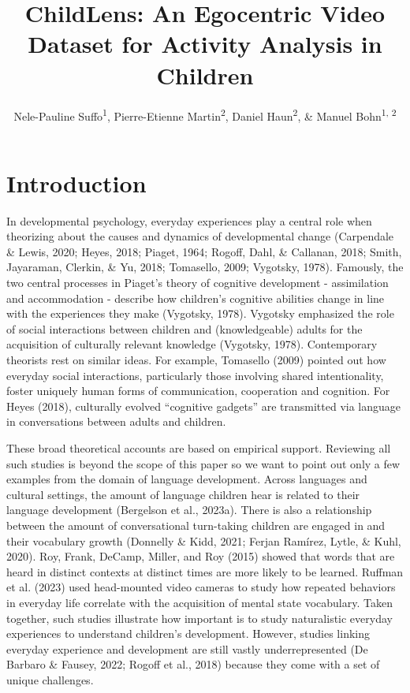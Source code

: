 \documentclass[
  man,floatsintext]{apa6}
\title{ChildLens: An Egocentric Video Dataset for Activity Analysis in Children}
\author{Nele-Pauline Suffo\textsuperscript{1}, Pierre-Etienne Martin\textsuperscript{2}, Daniel Haun\textsuperscript{2}, \& Manuel Bohn\textsuperscript{1, 2}}
\date{}
\affiliation{\vspace{0.5cm}\textsuperscript{1} Institute of Psychology in Education, Leuphana University Lüneburg\\\textsuperscript{2} Max Planck Institute for Evolutionary Anthropology}
\begin{document}
\maketitle

\section{Introduction}\label{introduction}

In developmental psychology, everyday experiences play a central role when theorizing about the causes and dynamics of developmental change (Carpendale \& Lewis, 2020; Heyes, 2018; Piaget, 1964; Rogoff, Dahl, \& Callanan, 2018; Smith, Jayaraman, Clerkin, \& Yu, 2018; Tomasello, 2009; Vygotsky, 1978). Famously, the two central processes in Piaget's theory of cognitive development - assimilation and accommodation - describe how children's cognitive abilities change in line with the experiences they make (Vygotsky, 1978). Vygotsky emphasized the role of social interactions between children and (knowledgeable) adults for the acquisition of culturally relevant knowledge (Vygotsky, 1978). Contemporary theorists rest on similar ideas. For example, Tomasello (2009) pointed out how everyday social interactions, particularly those involving shared intentionality, foster uniquely human forms of communication, cooperation and cognition. For Heyes (2018), culturally evolved ``cognitive gadgets'' are transmitted via language in conversations between adults and children.

These broad theoretical accounts are based on empirical support. Reviewing all such studies is beyond the scope of this paper so we want to point out only a few examples from the domain of language development. Across languages and cultural settings, the amount of language children hear is related to their language development (Bergelson et al., 2023a). There is also a relationship between the amount of conversational turn-taking children are engaged in and their vocabulary growth (Donnelly \& Kidd, 2021; Ferjan Ramírez, Lytle, \& Kuhl, 2020). Roy, Frank, DeCamp, Miller, and Roy (2015) showed that words that are heard in distinct contexts at distinct times are more likely to be learned. Ruffman et al. (2023) used head-mounted video cameras to study how repeated behaviors in everyday life correlate with the acquisition of mental state vocabulary. Taken together, such studies illustrate how important is to study naturalistic everyday experiences to understand children's development. However, studies linking everyday experience and development are still vastly underrepresented (De Barbaro \& Fausey, 2022; Rogoff et al., 2018) because they come with a set of unique challenges.
\end{document}
